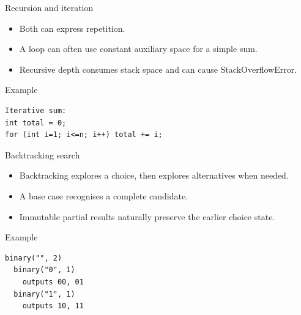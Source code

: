 \documentclass[10pt,aspectratio=169]{beamer}
\begin{document}
\begin{frame}[fragile,t]{Recursion and iteration}
\begin{itemize}
\item Both can express repetition.
\item A loop can often use constant auxiliary space for a simple sum.
\item Recursive depth consumes stack space and can cause StackOverflowError.
\end{itemize}
\vspace{1mm}\begin{block}{Example}
\begin{lstlisting}
Iterative sum:
int total = 0;
for (int i=1; i<=n; i++) total += i;
\end{lstlisting}
\end{block}
\end{frame}

\begin{frame}[fragile,t]{Backtracking search}
\begin{itemize}
\item Backtracking explores a choice, then explores alternatives when needed.
\item A base case recognises a complete candidate.
\item Immutable partial results naturally preserve the earlier choice state.
\end{itemize}
\vspace{1mm}\begin{block}{Example}
\begin{lstlisting}
binary("", 2)
  binary("0", 1)
    outputs 00, 01
  binary("1", 1)
    outputs 10, 11
\end{lstlisting}
\end{block}
\end{frame}
\end{document}
